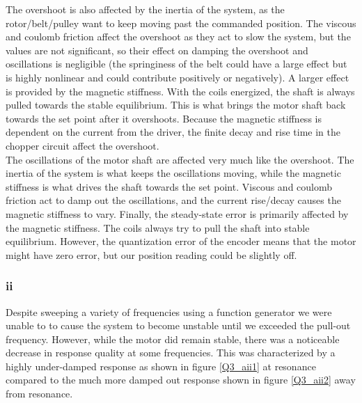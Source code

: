 \documentclass{article}
\theoremstyle{plain}
\theoremstyle{definition}
\theoremstyle{remark}
\begin{document}
The overshoot is also affected by the inertia of the system, as the rotor/belt/pulley want to keep moving past the commanded position. The viscous and coulomb friction affect the overshoot as they act to slow the system, but the values are not significant, so their effect on damping the overshoot and oscillations is negligible (the springiness of the belt could have a large effect but is highly nonlinear and could contribute positively or negatively). A larger effect is provided by the magnetic stiffness. With the coils energized, the shaft is always pulled towards the stable equilibrium. This is what brings the motor shaft back towards the set point after it overshoots. Because the magnetic stiffness is dependent on the current from the driver, the finite decay and rise time in the chopper circuit affect the overshoot.\\

The oscillations of the motor shaft are affected very much like the overshoot. The inertia of the system is what keeps the oscillations moving, while the magnetic stiffness is what drives the shaft towards the set point. Viscous and coulomb friction act to damp out the oscillations, and the current rise/decay causes the magnetic stiffness to vary. Finally, the steady-state error is primarily affected by the magnetic stiffness. The coils always try to pull the shaft into stable equilibrium. However, the quantization error of the encoder means that the motor might have zero error, but our position reading could be slightly off.\\


\clearpage
\subsubsection*{ii}

Despite sweeping a variety of frequencies using a function generator we were unable to to cause the system to become unstable until we exceeded the pull-out frequency.  However, while the motor did remain stable, there was a noticeable decrease in response quality at some frequencies.  This was characterized by a highly under-damped response as shown in figure \ref{Q3_aii1} at resonance compared to the much more damped out response shown in figure \ref{Q3_aii2} away from resonance.\\
\end{document}
